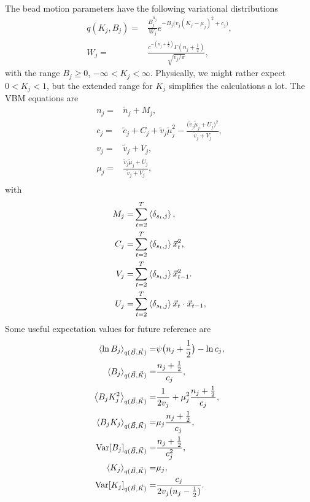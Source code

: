 The bead motion parameters have the following variational distributions
\begin{align}\label{seq:KBtrial}
  q(K_j,B_j)=&\frac{B_j^{n_j}}{W_j}e^{-B_j\big(v_j(K_j-\mu_j)^2+c_j\big)},\\
  W_j=&\frac{c^{-(n_j+\frac 12)}\Gamma(n_j+\frac 12)}{\sqrt{v_j/\pi}},
\end{align}
with the range $B_j\ge 0$, $-\infty<K_j<\infty$. Physically, we might
rather expect $0<K_j<1$, but the extended range for $K_j$ simplifies
the calculations a lot. The VBM equations are
\begin{align}
  n_j=& \tilde n_j+M_j,\label{seq:nj}\\
  c_j=& \tilde c_j+C_j+\tilde v_j\tilde\mu_j^2
  -\frac{\big(\tilde v_j\tilde\mu_j+U_j\big)^2}{\tilde v_j+V_j},\label{seq:cj}\\
  v_j=&\tilde v_j+V_j,\label{seq:vj}\\
  \mu_j=&\frac{\tilde v_j\tilde\mu_j+U_j}{\tilde v_j+V_j},\label{seq:muj}\\
\end{align}
with
\begin{align}
  M_j=&\sum_{t=2}^T\left\langle \delta_{s_t,j}\right\rangle,\label{seq:Mj}\\
  C_j=&\sum_{t=2}^T\left\langle \delta_{s_t,j}\right\rangle\vec{x}_t^2,\label{seq:Cj}\\
  V_j=&\sum_{t=2}^T\left\langle \delta_{s_t,j}\right\rangle\vec{x}_{t-1}^2.\label{seq:Vj}\\
  U_j=&\sum_{t=2}^T\left\langle \delta_{s_t,j}\right\rangle\vec{x}_t\cdot\vec{x}_{t-1},\label{seq:Uj}
\end{align}
Some useful expectation values for future reference are
\begin{align}
  \left\langle \ln B_j\right\rangle_{q(\vec{B},\vec{K})}=&\psi\big(n_j+\frac 12\big)-\ln c_j,
  \label{seq:meanBlogB}\\
  \left\langle B_j\right\rangle_{q(\vec{B},\vec{K})}=&\frac{n_j+\frac 12}{c_j},\\
  \left\langle B_jK_j^2\right\rangle_{q(\vec{B},\vec{K})}=&\frac{1}{2v_j}
  +\mu_j^2\frac{n_j+\frac 12}{c_j},\\
  \left\langle B_jK_j\right\rangle_{q(\vec{B},\vec{K})}=&\mu_j\frac{n_j+\frac 12}{c_j},
  \label{seq:meanbK2BK}\\
  \text{Var}[B_j]_{q(\vec{B},\vec{K})}=&\frac{n_j+\frac 12}{c_j^2},\\
  \left\langle K_j\right\rangle_{q(\vec{B},\vec{K})}=&\mu_j,\\ 
  \text{Var}[K_j]_{q(\vec{B},\vec{K})}=&\frac{c_j}{2v_j(n_j-\frac 12)}.
\end{align}
